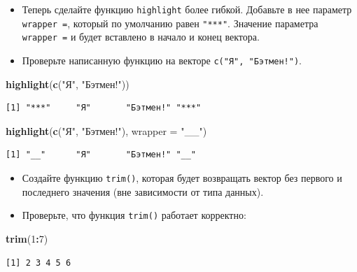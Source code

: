 \documentclass[
]{book}
\newenvironment{Shaded}{\begin{snugshade}}{\end{snugshade}}
\newcommand{\DataTypeTok}[1]{\textcolor[rgb]{0.13,0.29,0.53}{#1}}
\newcommand{\DecValTok}[1]{\textcolor[rgb]{0.00,0.00,0.81}{#1}}
\newcommand{\KeywordTok}[1]{\textcolor[rgb]{0.13,0.29,0.53}{\textbf{#1}}}
\newcommand{\NormalTok}[1]{#1}
\newcommand{\OperatorTok}[1]{\textcolor[rgb]{0.81,0.36,0.00}{\textbf{#1}}}
\newcommand{\StringTok}[1]{\textcolor[rgb]{0.31,0.60,0.02}{#1}}
\begin{document}
\begin{itemize}
\item
  Теперь сделайте функцию \texttt{highlight} более гибкой. Добавьте в нее параметр \texttt{wrapper\ =}, который по умолчанию равен \texttt{"***"}. Значение параметра \texttt{wrapper\ =} и будет вставлено в начало и конец вектора.
\item
  Проверьте написанную функцию на векторе \texttt{c("Я",\ "Бэтмен!")}.
\end{itemize}

\begin{Shaded}
\begin{Highlighting}[]
\KeywordTok{highlight}\NormalTok{(}\KeywordTok{c}\NormalTok{(}\StringTok{"Я"}\NormalTok{, }\StringTok{"Бэтмен!"}\NormalTok{)) }
\end{Highlighting}
\end{Shaded}

\begin{verbatim}
[1] "***"     "Я"       "Бэтмен!" "***"    
\end{verbatim}

\begin{Shaded}
\begin{Highlighting}[]
\KeywordTok{highlight}\NormalTok{(}\KeywordTok{c}\NormalTok{(}\StringTok{"Я"}\NormalTok{, }\StringTok{"Бэтмен!"}\NormalTok{), }\DataTypeTok{wrapper =} \StringTok{"__"}\NormalTok{) }
\end{Highlighting}
\end{Shaded}

\begin{verbatim}
[1] "__"      "Я"       "Бэтмен!" "__"     
\end{verbatim}

\begin{itemize}
\item
  Создайте функцию \texttt{trim()}, которая будет возвращать вектор без первого и последнего значения (вне зависимости от типа данных).
\item
  Проверьте, что функция \texttt{trim()} работает корректно:
\end{itemize}

\begin{Shaded}
\begin{Highlighting}[]
\KeywordTok{trim}\NormalTok{(}\DecValTok{1}\OperatorTok{:}\DecValTok{7}\NormalTok{)}
\end{Highlighting}
\end{Shaded}

\begin{verbatim}
[1] 2 3 4 5 6
\end{verbatim}
\end{document}
